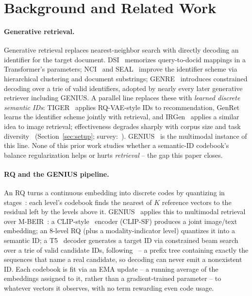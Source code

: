 \section{Background and Related Work}
\label{sec:background}

\paragraph{Generative retrieval.} Generative retrieval replaces nearest-neighbor search with directly decoding an identifier for the target document. DSI~\cite{tay2022dsi} memorizes query-to-docid mappings in a Transformer's parameters; NCI~\cite{wang2022nci} and SEAL~\cite{bevilacqua2022seal} improve the identifier scheme via hierarchical clustering and document substrings; GENRE~\cite{decao2021genre} introduces constrained decoding over a trie of valid identifiers, adopted by nearly every later generative retriever including GENIUS. A parallel line replaces these with \emph{learned discrete semantic IDs}: TIGER~\cite{rajput2023tiger} applies RQ-VAE-style IDs to recommendation, GenRet~\cite{sun2023genret} learns the identifier scheme jointly with retrieval, and IRGen~\cite{zhang2023irgen} applies a similar idea to image retrieval; effectiveness degrades sharply with corpus size and task diversity~\cite{pradeep2023scale} (Section~\ref{sec:setup}; survey:~\cite{li2024survey}). GENIUS~\cite{kim2025genius} is the multimodal instance of this line. None of this prior work studies whether a semantic-ID codebook's balance regularization helps or hurts \emph{retrieval} -- the gap this paper closes.

\paragraph{RQ and the GENIUS pipeline.} An RQ turns a continuous embedding into discrete codes by quantizing in stages~\cite{lee2022rqvae}: each level's codebook finds the nearest of $K$ reference vectors to the residual left by the levels above it. GENIUS~\cite{kim2025genius} applies this to multimodal retrieval over M-BEIR~\cite{wei2024uniir}: a CLIP-style~\cite{radford2021clip} encoder (CLIP-SF) produces a joint image/text embedding; an 8-level RQ (plus a modality-indicator level) quantizes it into a semantic ID; a T5~\cite{raffel2020t5} decoder generates a target ID via constrained beam search over a trie of valid candidate IDs, following~\cite{decao2021genre} -- a prefix tree containing exactly the sequences that name a real candidate, so decoding can never emit a nonexistent ID. Each codebook is fit via an EMA update -- a running average of the embeddings assigned to it, rather than a gradient-trained parameter -- to whatever vectors it observes, with no term rewarding even code usage.

